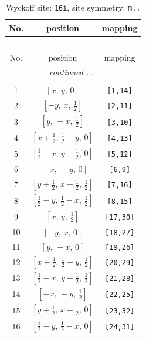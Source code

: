 \documentclass[fleqn,8pt]{jsarticle}
\begin{document}
\begin{longtable}{ccc}
\caption{Wyckoff site: {\tt 16i}, site symmetry: {\tt m..}}
 \\
 \hline \hline
No. & position & mapping \\ \hline \endfirsthead

\multicolumn{2}{l}{\tablename\ \thetable{}} \\
 \hline \hline
No. & position & mapping \\ \hline \endhead

 \hline \hline
\multicolumn{2}{r}{\footnotesize\it continued ...} \\ \endfoot

 \hline \hline
\multicolumn{2}{r}{} \\ \endlastfoot

1 & $\left[ x,\, y,\, 0 \right]$ & {\tt [1,14]} \\ \hline
2 & $\left[ - y,\, x,\, \frac{1}{2} \right]$ & {\tt [2,11]} \\ \hline
3 & $\left[ y,\, - x,\, \frac{1}{2} \right]$ & {\tt [3,10]} \\ \hline
4 & $\left[ x + \frac{1}{2},\, \frac{1}{2} - y,\, 0 \right]$ & {\tt [4,13]} \\ \hline
5 & $\left[ \frac{1}{2} - x,\, y + \frac{1}{2},\, 0 \right]$ & {\tt [5,12]} \\ \hline
6 & $\left[ - x,\, - y,\, 0 \right]$ & {\tt [6,9]} \\ \hline
7 & $\left[ y + \frac{1}{2},\, x + \frac{1}{2},\, \frac{1}{2} \right]$ & {\tt [7,16]} \\ \hline
8 & $\left[ \frac{1}{2} - y,\, \frac{1}{2} - x,\, \frac{1}{2} \right]$ & {\tt [8,15]} \\ \hline
9 & $\left[ x,\, y,\, \frac{1}{2} \right]$ & {\tt [17,30]} \\ \hline
10 & $\left[ - y,\, x,\, 0 \right]$ & {\tt [18,27]} \\ \hline
11 & $\left[ y,\, - x,\, 0 \right]$ & {\tt [19,26]} \\ \hline
12 & $\left[ x + \frac{1}{2},\, \frac{1}{2} - y,\, \frac{1}{2} \right]$ & {\tt [20,29]} \\ \hline
13 & $\left[ \frac{1}{2} - x,\, y + \frac{1}{2},\, \frac{1}{2} \right]$ & {\tt [21,28]} \\ \hline
14 & $\left[ - x,\, - y,\, \frac{1}{2} \right]$ & {\tt [22,25]} \\ \hline
15 & $\left[ y + \frac{1}{2},\, x + \frac{1}{2},\, 0 \right]$ & {\tt [23,32]} \\ \hline
16 & $\left[ \frac{1}{2} - y,\, \frac{1}{2} - x,\, 0 \right]$ & {\tt [24,31]} \\
\end{longtable}
\end{document}
